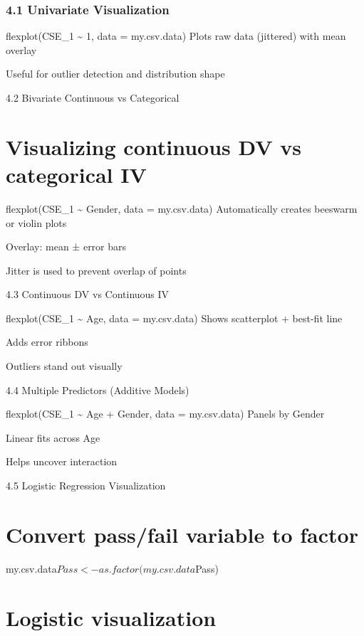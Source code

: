 \documentclass[
  letterpaper,
  DIV=11,
  numbers=noendperiod]{scrreprt}
\begin{document}
{\subsection{4.1 Univariate
Visualization}\label{univariate-visualization}

flexplot(CSE\_1 \textasciitilde{} 1, data = my.csv.data) Plots raw data
(jittered) with mean overlay

Useful for outlier detection and distribution shape

4.2 Bivariate Continuous vs Categorical


\chapter{Visualizing continuous DV vs categorical
IV}\label{visualizing-continuous-dv-vs-categorical-iv}

flexplot(CSE\_1 \textasciitilde{} Gender, data = my.csv.data)
Automatically creates beeswarm or violin plots

Overlay: mean ± error bars

Jitter is used to prevent overlap of points

4.3 Continuous DV vs Continuous IV

flexplot(CSE\_1 \textasciitilde{} Age, data = my.csv.data) Shows
scatterplot + best-fit line

Adds error ribbons

Outliers stand out visually

4.4 Multiple Predictors (Additive Models)

flexplot(CSE\_1 \textasciitilde{} Age + Gender, data = my.csv.data)
Panels by Gender

Linear fits across Age

Helps uncover interaction

4.5 Logistic Regression Visualization


\chapter{Convert pass/fail variable to
factor}\label{convert-passfail-variable-to-factor}

my.csv.data\(Pass <- as.factor(my.csv.data\)Pass)


\chapter{Logistic visualization}\label{logistic-visualization}

}
\end{document}
